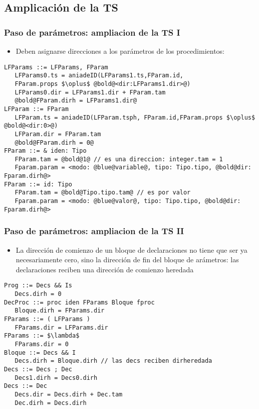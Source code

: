 \documentclass[hyperref={pdfpagelabels=false},tree-dvips,compress]{beamer}
\begin{document}
\subsection{Amplicación de la TS}
\begin{frame}[fragile]
\frametitle{Paso de parámetros: ampliacion de la TS I}

\begin{itemize}
	\item Deben asignarse direcciones a los parámetros de los procedimientos:
\end{itemize}

\begin{lstlisting}[style=gramaticas,basicstyle=\scriptsize\ttfamily,mathescape]
LFParams ::= LFParams, FParam
   LFParams0.ts = aniadeID(LFParams1.ts,FParam.id,
   FParam.props $\oplus$ @bold@<dir:LFParams1.dir>@)
   LFParams0.dir = LFParams1.dir + FParam.tam
   @bold@FParam.dirh = LFParams1.dir@
LFParam ::= FParam
   LFParam.ts = aniadeID(LFParam.tsph, FParam.id,FParam.props $\oplus$ @bold@<dir:0>@)
   LFParam.dir = FParam.tam
   @bold@FParam.dirh = 0@
FParam ::= & iden: Tipo
   FParam.tam = @bold@1@ // es una direccion: integer.tam = 1
   Fparam.param = <modo: @blue@variable@, tipo: Tipo.tipo, @bold@dir: Fparam.dirh@>
FParam ::= id: Tipo
   FParam.tam = @bold@Tipo.tipo.tam@ // es por valor
   Fparam.param = <modo: @blue@valor@, tipo: Tipo.tipo, @bold@dir: Fparam.dirh@>
\end{lstlisting}

\end{frame}
\begin{frame}[fragile]
\frametitle{Paso de parámetros: ampliacion de la TS II}

\begin{itemize}
	\item La dirección de comienzo de un bloque de declaraciones no tiene que ser ya necesariamente cero, sino la dirección de fin del bloque de arámetros: las declaraciones reciben una dirección de comienzo heredada
\end{itemize}

\begin{lstlisting}[style=gramaticas,basicstyle=\scriptsize\ttfamily,mathescape]
Prog ::= Decs && Is
   Decs.dirh = 0
DecProc ::= proc iden FParams Bloque fproc
   Bloque.dirh = FParams.dir
FParams ::= ( LFParams )
   FParams.dir = LFParams.dir
FParams ::= $\lambda$
   FParams.dir = 0
Bloque ::= Decs && I
   Decs.dirh = Bloque.dirh // las decs reciben dirheredada
Decs ::= Decs ; Dec
   Decs1.dirh = Decs0.dirh
Decs ::= Dec
   Decs.dir = Decs.dirh + Dec.tam
   Dec.dirh = Decs.dirh
\end{lstlisting}

\end{frame}
\end{document}
